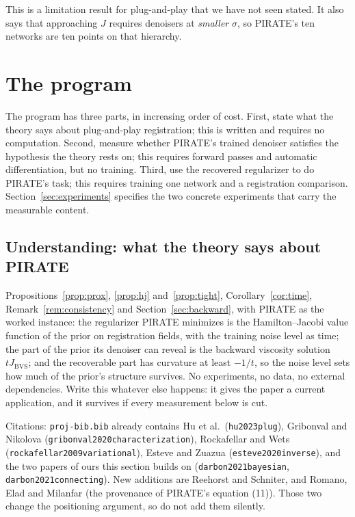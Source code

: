 \documentclass[11pt]{article}
\theoremstyle{definition}
\newcommand{\code}[1]{\texttt{#1}}
\newcommand{\Jbvs}{J_{\mathrm{BVS}}}
\begin{document}
This is a limitation result for plug-and-play that we have not seen stated. It also says that approaching $J$ requires denoisers at \emph{smaller} $\sigma$, so PIRATE's ten networks are ten points on that hierarchy.

\section{The program}
\label{sec:programme}

The program has three parts, in increasing order of cost. First, state what the theory says about plug-and-play registration; this is written and requires no computation. Second, measure whether PIRATE's trained denoiser satisfies the hypothesis the theory rests on; this requires forward passes and automatic differentiation, but no training. Third, use the recovered regularizer to do PIRATE's task; this requires training one network and a registration comparison. Section~\ref{sec:experiments} specifies the two concrete experiments that carry the measurable content.

\subsection{Understanding: what the theory says about PIRATE}
\label{sec:tier0}

Propositions~\ref{prop:prox}, \ref{prop:hj} and~\ref{prop:tight}, Corollary~\ref{cor:time}, Remark~\ref{rem:consistency} and Section~\ref{sec:backward}, with PIRATE as the worked instance: the regularizer PIRATE minimizes is the Hamilton--Jacobi value function of the prior on registration fields, with the training noise level as time; the part of the prior its denoiser can reveal is the backward viscosity solution $t\Jbvs$; and the recoverable part has curvature at least $-1/t$, so the noise level sets how much of the prior's structure survives. No experiments, no data, no external dependencies. Write this whatever else happens: it gives the paper a current application, and it survives if every measurement below is cut.

Citations: \code{proj-bib.bib} already contains Hu et al.\ (\code{hu2023plug}), Gribonval and Nikolova (\code{gribonval2020characterization}), Rockafellar and Wets (\code{rockafellar2009variational}), Esteve and Zuazua (\code{esteve2020inverse}), and the two papers of ours this section builds on (\code{darbon2021bayesian}, \code{darbon2021connecting}). New additions are Reehorst and Schniter, and Romano, Elad and Milanfar (the provenance of PIRATE's equation (11)). Those two change the positioning argument, so do not add them silently.
\end{document}
